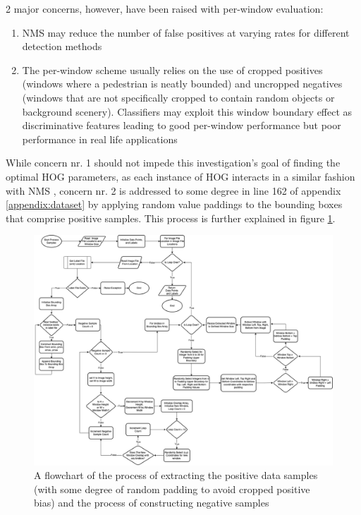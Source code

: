 2 major concerns, however, have been raised with per-window evaluation: 
\begin{enumerate}
    \item NMS may reduce the number of false positives at varying rates for different detection methods \cite{dollar_2009_pedestrian}
    \item The per-window scheme usually relies on the use of cropped positives (windows where a pedestrian is neatly bounded) and uncropped negatives (windows that are not specifically cropped to contain random objects or background scenery). Classifiers may exploit this window boundary effect as discriminative features leading to good per-window performance but poor performance in real life applications \cite{dollar_2009_pedestrian}
\end{enumerate} 

While concern nr. 1 should not impede this investigation's goal of finding the optimal HOG parameters, as each instance of HOG interacts in a similar fashion with NMS \cite{dalal_2005_histograms}, concern nr. 2 is addressed to some degree in line 162 of appendix \ref{appendix:dataset} by applying random value paddings to the bounding boxes that comprise positive samples. This process is further explained in figure \ref{fig:dataset_low}.

\begin{figure}
    \centering
    \includegraphics[width=\linewidth]{images/ee_dataset_low.drawio (1).png}
    \caption{A flowchart of the process of extracting the positive data samples (with some degree of random padding to avoid cropped positive bias) and the process of constructing negative samples }
    \label{fig:dataset_low}
\end{figure}

